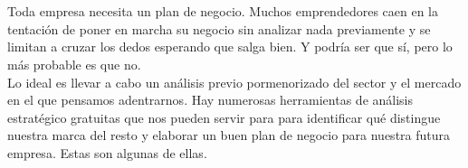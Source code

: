 \begin{center}
\caption\textbf{HERRAMIENTAS DE BUSINESS ANALITYCS}
\end{center}
\\
\\
Toda empresa necesita un plan de negocio. Muchos emprendedores caen en la tentación de poner en marcha su negocio sin analizar nada previamente y se limitan a cruzar los dedos esperando que salga bien. Y podría ser que sí, pero lo más probable es que no.\\
Lo ideal es llevar a cabo un análisis previo pormenorizado del sector y el mercado en el que pensamos adentrarnos. Hay numerosas herramientas de análisis estratégico gratuitas que nos pueden servir para para identificar qué distingue nuestra marca del resto y elaborar un buen plan de negocio para nuestra futura empresa. Estas son algunas de ellas.  
\\
